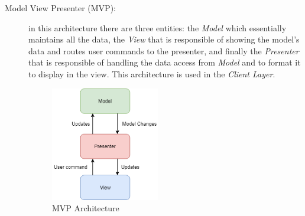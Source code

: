 \documentclass[a4paper]{article}
\begin{document}
\begin{description}
        \newpage
        \item[Model View Presenter (MVP):] in this architecture there are three entities: the \textit{Model} which essentially maintains all the data, the \textit{View} that is responsible of showing the model's data and routes user commands to the presenter, and finally the \textit{Presenter} that is responsible of handling the data access from \textit{Model} and to format it to display in the view.
        This architecture is used in the \textit{Client Layer}.
        \begin{figure}[!hb]
            \centering
            \includegraphics[height=50mm, keepaspectratio]{DD/images/mvp.png}
            \caption{MVP Architecture}
            \label{fig:mvp}
        \end{figure}
    \end{description}
\end{document}
